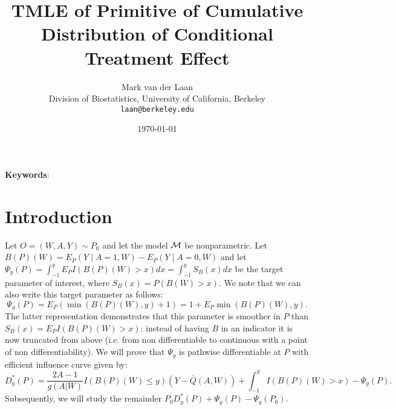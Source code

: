 \documentclass[11pt]{article}
\title{TMLE of Primitive of Cumulative Distribution of Conditional Treatment Effect}
\author{Mark van der Laan \\ Division of Biostatistics, University of California, Berkeley\\ {\tt laan@berkeley.edu}
\\
} \date{\today}
\begin{document}
\maketitle
 
\begin{abstract}
 
\end{abstract}

{\bf Keywords}: 

\section{Introduction}
Let $O=(W,A,Y)\sim P_0$ and let the model ${\cal M}$ be nonparametric. Let $B(P)(W)=E_P(Y\mid A=1,W)-E_P(Y\mid A=0,W)$ and let 
$\Psi_y(P)=\int_{-1}^y E_PI(B(P)(W)>x) dx=\int_{-1}^y  S_B(x) dx$ be the target parameter of interest, where $S_B(x)=P(B(W)>x)$.
We note that we can also write this target parameter as  follows:
\[
\Psi_y(P)=E_P( \min(B(P)(W),y)+1)=1+E_P\min(B(P)(W),y).\]
The latter representation demonstrates that this parameter is smoother in $P$ than $S_B(x)=E_PI(B(P)(W)>x)$: instead of having $B$ in an indicator it is now truncated from above (i.e. from non differentiable to continuous with a point of non differentiability). 
We will prove that $\Psi_y$ is pathwise differentiable at $P$ with   efficient influence curve given by:
\[
D^*_y(P)=\frac{2A-1}{g(A|W)}I(B(P)(W)\leq y)(Y-\bar{Q}(A,W))+\int_{-1}^yI(B(P)(W)>x)-\Psi_y(P).\]
Subsequently, we will study the remainder $P_0D^*_y(P)+\Psi_y(P)-\Psi_y(P_0)$.
\end{document}
